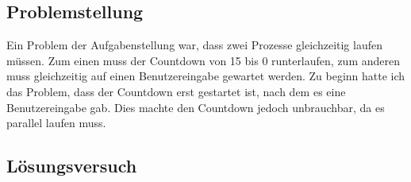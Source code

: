 \documentclass{article}
\begin{document}
\subsection{Problemstellung}
\par
    Ein Problem der Aufgabenstellung war, dass zwei Prozesse gleichzeitig laufen müssen. Zum einen muss der Countdown von 15 bis 0 runterlaufen, zum anderen muss gleichzeitig auf einen Benutzereingabe gewartet werden. Zu beginn hatte ich das Problem, dass der Countdown erst gestartet ist, nach dem es eine Benutzereingabe gab. Dies machte den Countdown jedoch unbrauchbar, da es parallel laufen muss.
\subsection{Lösungsversuch}

\par
\end{document}
